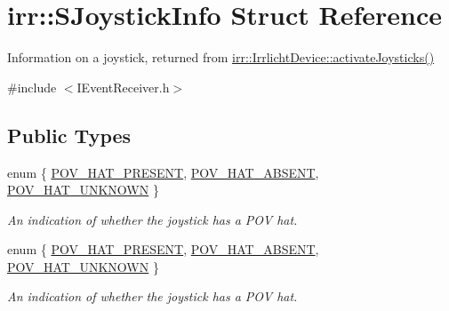 \hypertarget{structirr_1_1SJoystickInfo}{}\section{irr\+:\+:S\+Joystick\+Info Struct Reference}
\label{structirr_1_1SJoystickInfo}


Information on a joystick, returned from \hyperlink{classirr_1_1IrrlichtDevice_af06f8d2c4fdffd1f879e46685bcbc6e3}{irr\+::\+Irrlicht\+Device\+::activate\+Joysticks()}  




{\ttfamily \#include $<$I\+Event\+Receiver.\+h$>$}

\subsection*{Public Types}
\begin{DoxyCompactItemize}
\item 
enum \{ \hyperlink{structirr_1_1SJoystickInfo_ad6a9e7ef00b0d259a7c90bb3778cd615a59f66864139554ef9dbbe69abfd1409c}{P\+O\+V\+\_\+\+H\+A\+T\+\_\+\+P\+R\+E\+S\+E\+NT}, 
\hyperlink{structirr_1_1SJoystickInfo_ad6a9e7ef00b0d259a7c90bb3778cd615ad37cb28140c95eae7959a3bbdf700a23}{P\+O\+V\+\_\+\+H\+A\+T\+\_\+\+A\+B\+S\+E\+NT}, 
\hyperlink{structirr_1_1SJoystickInfo_ad6a9e7ef00b0d259a7c90bb3778cd615ae729464d5c61c8edc6da7319491b5313}{P\+O\+V\+\_\+\+H\+A\+T\+\_\+\+U\+N\+K\+N\+O\+WN}
 \}\begin{DoxyCompactList}\small\item\em An indication of whether the joystick has a P\+OV hat. \end{DoxyCompactList}
\item 
enum \{ \hyperlink{structirr_1_1SJoystickInfo_ad6a9e7ef00b0d259a7c90bb3778cd615a59f66864139554ef9dbbe69abfd1409c}{P\+O\+V\+\_\+\+H\+A\+T\+\_\+\+P\+R\+E\+S\+E\+NT}, 
\hyperlink{structirr_1_1SJoystickInfo_ad6a9e7ef00b0d259a7c90bb3778cd615ad37cb28140c95eae7959a3bbdf700a23}{P\+O\+V\+\_\+\+H\+A\+T\+\_\+\+A\+B\+S\+E\+NT}, 
\hyperlink{structirr_1_1SJoystickInfo_ad6a9e7ef00b0d259a7c90bb3778cd615ae729464d5c61c8edc6da7319491b5313}{P\+O\+V\+\_\+\+H\+A\+T\+\_\+\+U\+N\+K\+N\+O\+WN}
 \}\begin{DoxyCompactList}\small\item\em An indication of whether the joystick has a P\+OV hat. \end{DoxyCompactList}
\end{DoxyCompactItemize}
